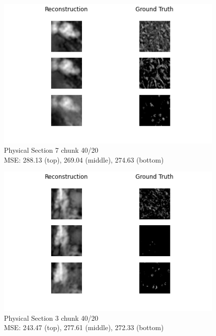 \documentclass[10pt,twocolumn,letterpaper]{article}
\begin{document}
\vspace*{0.05cm}

\begin{figure}[!h]
	\centering
	\captionsetup{justification=centering}
		\hspace*{-1cm}
		\includegraphics[scale=0.65]{../figures/7_40_20.png}
	\caption{Physical Section 7 chunk 40/20\\ MSE: 288.13 (top), 269.04 (middle), 274.63 (bottom)}		
\end{figure}

\vspace*{0.05cm}

\begin{figure}[!h]
	\centering
	\captionsetup{justification=centering}
		\hspace*{-1cm}	
		\includegraphics[scale=0.65]{../figures/3_40_20.png}
	\caption{Physical Section 3 chunk 40/20\\ MSE: 243.47 (top), 277.61 (middle), 272.33 (bottom)}		
\end{figure}

\vspace*{0.05cm}
\end{document}
